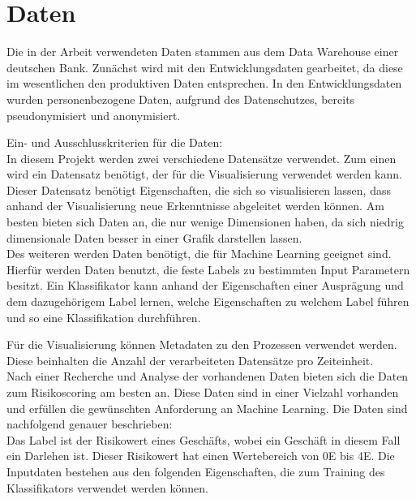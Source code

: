 \chapter{Daten}\label{ch:data}
Die in der Arbeit verwendeten Daten stammen aus dem Data Warehouse einer deutschen Bank.
Zunächst wird mit den Entwicklungsdaten gearbeitet, da diese im wesentlichen den produktiven Daten entsprechen.
In den Entwicklungsdaten wurden personenbezogene Daten, aufgrund des Datenschutzes, bereits pseudonymisiert und anonymisiert.


Ein- und Ausschlusskriterien für die Daten:\\
In diesem Projekt werden zwei verschiedene Datensätze verwendet. 
Zum einen wird ein Datensatz benötigt, der für die Visualisierung verwendet werden kann. 
Dieser Datensatz benötigt Eigenschaften, die sich so visualisieren lassen, dass anhand der Visualisierung neue Erkenntnisse abgeleitet werden können.
Am besten bieten sich Daten an, die nur wenige Dimensionen haben, da sich niedrig dimensionale Daten besser in einer Grafik darstellen lassen. 
\\
Des weiteren werden Daten benötigt, die für Machine Learning geeignet sind. 
Hierfür werden Daten benutzt, die feste Labels zu bestimmten Input Parametern besitzt.
Ein Klassifikator kann anhand der Eigenschaften einer Ausprägung und dem dazugehörigem Label lernen, welche Eigenschaften zu welchem Label führen und so eine Klassifikation durchführen. 


Für die Visualisierung können Metadaten zu den Prozessen verwendet werden.
Diese beinhalten die Anzahl der verarbeiteten Datensätze pro Zeiteinheit.
\\

Nach einer Recherche und Analyse der vorhandenen Daten bieten sich die Daten zum Risikoscoring am besten an.
Diese Daten sind in einer Vielzahl vorhanden und erfüllen die gewünschten Anforderung an Machine Learning. 
Die Daten sind nachfolgend genauer beschrieben: \\
Das Label ist der Risikowert eines Geschäfts, wobei ein Geschäft in diesem Fall ein Darlehen ist.
Dieser Risikowert hat einen Wertebereich von 0E bis 4E.
Die Inputdaten bestehen aus den folgenden Eigenschaften, die zum Training des Klassifikators verwendet werden können. 



